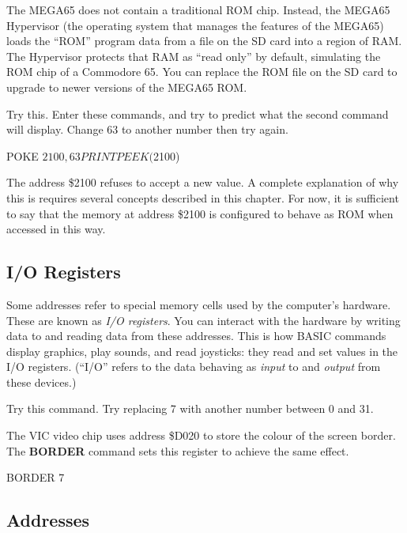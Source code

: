 The MEGA65 does not contain a traditional ROM chip. Instead, the MEGA65 Hypervisor (the operating system that manages the features of the MEGA65) loads the ``ROM'' program data from a file on the SD card into a region of RAM. The Hypervisor protects that RAM as ``read only'' by default, simulating the ROM chip of a Commodore 65. You can replace the ROM file on the SD card to upgrade to newer versions of the MEGA65 ROM.

Try this. Enter these commands, and try to predict what the second command will display. Change 63 to another number then try again.

\begin{basiccode}
POKE $2100,63
PRINT PEEK($2100)
\end{basiccode}

The address \$2100 refuses to accept a new value. A complete explanation of why this is requires several concepts described in this chapter. For now, it is sufficient to say that the memory at address \$2100 is configured to behave as ROM when accessed in this way.

\subsection{I/O Registers}

Some addresses refer to special memory cells used by the computer's hardware. These are known as {\em I/O registers}. You can interact with the hardware by writing data to and reading data from these addresses. This is how BASIC commands display graphics, play sounds, and read joysticks: they read and set values in the I/O registers. (``I/O'' refers to the data behaving as \emph{input} to and \emph{output} from these devices.)

Try this command. Try replacing 7 with another number between 0 and 31.


The VIC video chip uses address \$D020 to store the colour of the screen border. The {\bf BORDER} command sets this register to achieve the same effect.

\begin{basiccode}
BORDER 7
\end{basiccode}

\subsection{Addresses}

